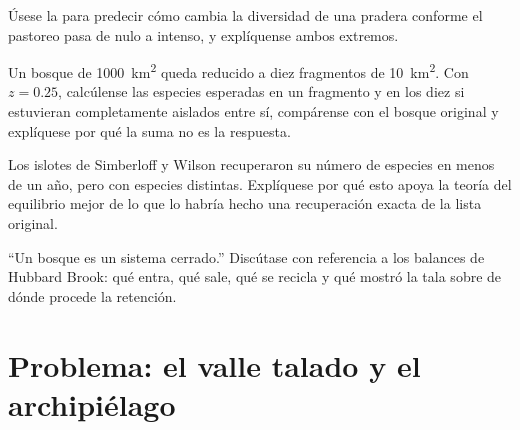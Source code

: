 \begin{exercise}[$\star\star$]\label{exo:b1:ecosystem-dynamics:9}
Úsese la  para predecir cómo cambia
la diversidad de una pradera conforme el pastoreo pasa de nulo a intenso, y
explíquense ambos extremos.
\end{exercise}

\begin{exercise}[$\star\star\star$]\label{exo:b1:ecosystem-dynamics:10}
Un bosque de \qty{1000}{km^2} queda reducido a diez fragmentos de
\qty{10}{km^2}. Con $z = 0.25$, calcúlense las especies esperadas en un
fragmento y en los diez si estuvieran completamente aislados entre sí,
compárense con el bosque original y explíquese por qué la suma no es la
respuesta.
\end{exercise}

\begin{exercise}[$\star\star\star$]\label{exo:b1:ecosystem-dynamics:11}
Los islotes de Simberloff y Wilson recuperaron su número de especies en
menos de un año, pero con especies distintas. Explíquese por qué esto apoya
la teoría del equilibrio mejor de lo que lo habría hecho una recuperación
exacta de la lista original.
\end{exercise}

\begin{exercise}[$\star\star\star$]\label{exo:b1:ecosystem-dynamics:12}
``Un bosque  es un sistema cerrado.'' Discútase con referencia a los
balances de Hubbard Brook: qué entra, qué sale, qué se recicla y qué mostró
la tala sobre de dónde procede la retención.
\end{exercise}

\section{Problema: el valle talado y el archipiélago}

